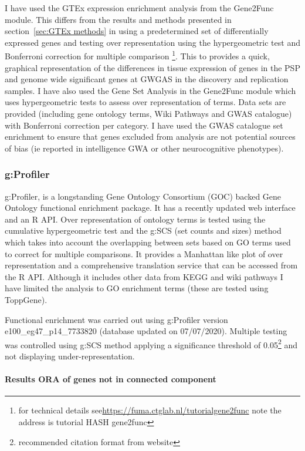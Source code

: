 I have used the GTEx expression enrichment analysis from the Gene2Func module. This differs from the results and methods presented in section~\ref{sec:GTEx methods} in using a predetermined set of differentially expressed genes and testing over representation using the hypergeometric test and Bonferroni correction for multiple comparison \footnote{for technical details see\url{https://fuma.ctglab.nl/tutorialgene2func} note the address is tutorial HASH gene2func}. This to provides a quick, graphical representation of the differences in tissue expression of genes in the PSP and genome wide significant genes at GWGAS in the discovery and replication samples. I have also used the Gene Set Analysis in the Gene2Func module which uses hypergeometric tests to assess over representation of terms. Data sets are provided (including gene ontology terms, Wiki Pathways and GWAS catalogue) with Bonferroni correction per category. I have used the GWAS catalogue set enrichment to ensure that genes excluded from analysis are not potential sources of bias (ie reported in intelligence GWA or other neurocognitive phenotypes).

\subsubsection{g:Profiler} 
\label{sec:gProfiler GO enrichment}
g:Profiler, is a longstanding Gene Ontology Consortium (GOC) backed Gene Ontology functional enrichment package. It has a recently updated web interface and an R API. Over representation of ontology terms is tested using the cumulative hypergeometric test \cite{raudvere2019g} and the g:SCS (set counts and sizes) method which takes into account the overlapping between sets based on GO terms \cite{reimand2007g} used to correct for multiple comparisons. It provides a  Manhattan like plot of over representation and a comprehensive translation service that can be accessed from the R API. Although it includes other data from KEGG and wiki pathways I have limited the analysis to GO enrichment terms (these are tested using ToppGene). 

Functional enrichment was carried out using g:Profiler version e100\_eg47\_p14\_7733820 (database updated on 07/07/2020). Multiple testing was controlled using g:SCS method applying a significance threshold of 0.05\footnote{recommended citation format from website} and not displaying  under-representation.



\paragraph{Results ORA of genes not in connected component}


